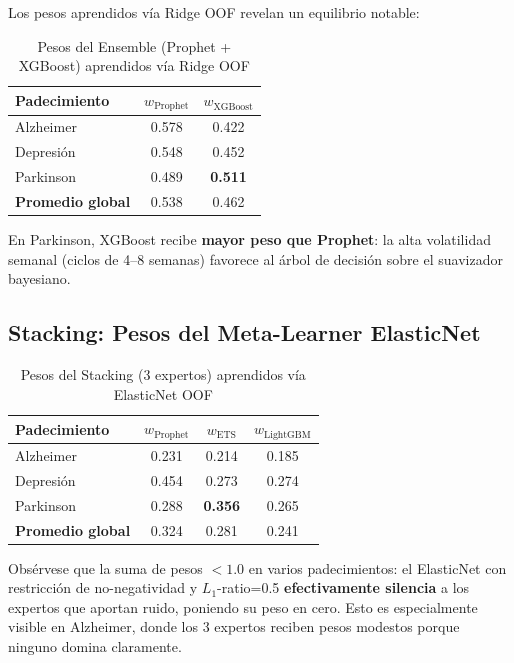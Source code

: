 \documentclass[12pt, letterpaper]{article}
\begin{document}
Los pesos aprendidos vía Ridge OOF revelan un equilibrio notable:

\begin{table}[H]
\centering
\caption{Pesos del Ensemble (Prophet + XGBoost) aprendidos vía Ridge OOF}
\label{tab:ensemble_weights}
\small
\begin{tabular}{lcc}
\toprule
\textbf{Padecimiento} & $w_{\text{Prophet}}$ & $w_{\text{XGBoost}}$ \\
\midrule
Alzheimer  & 0.578 & 0.422 \\
Depresión  & 0.548 & 0.452 \\
Parkinson  & 0.489 & \textbf{0.511} \\
\midrule
\textbf{Promedio global} & 0.538 & 0.462 \\
\bottomrule
\end{tabular}
\end{table}

En Parkinson, XGBoost recibe \textbf{mayor peso que Prophet}: la alta volatilidad semanal (ciclos de 4--8 semanas) favorece al árbol de decisión sobre el suavizador bayesiano.

\subsection{Stacking: Pesos del Meta-Learner ElasticNet}

\begin{table}[H]
\centering
\caption{Pesos del Stacking (3 expertos) aprendidos vía ElasticNet OOF}
\label{tab:stacking_weights}
\small
\begin{tabular}{lccc}
\toprule
\textbf{Padecimiento} & $w_{\text{Prophet}}$ & $w_{\text{ETS}}$ & $w_{\text{LightGBM}}$ \\
\midrule
Alzheimer  & 0.231 & 0.214 & 0.185 \\
Depresión  & 0.454 & 0.273 & 0.274 \\
Parkinson  & 0.288 & \textbf{0.356} & 0.265 \\
\midrule
\textbf{Promedio global} & 0.324 & 0.281 & 0.241 \\
\bottomrule
\end{tabular}
\end{table}

Obsérvese que la suma de pesos $< 1.0$ en varios padecimientos: el ElasticNet con restricción de no-negatividad y $L_1$-ratio=0.5 \textbf{efectivamente silencia} a los expertos que aportan ruido, poniendo su peso en cero. Esto es especialmente visible en Alzheimer, donde los 3 expertos reciben pesos modestos porque ninguno domina claramente.
\end{document}

